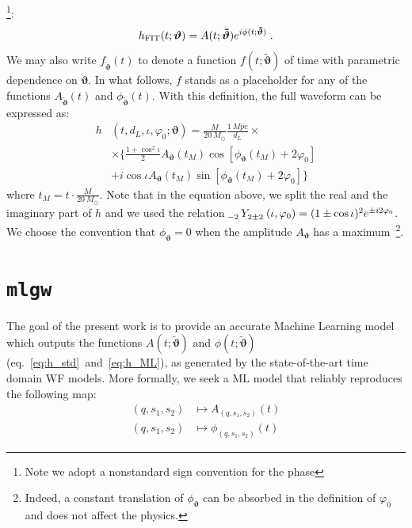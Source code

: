 \footnote{Note we adopt a nonstandard sign convention for the phase}:
\begin{equation} \label{eq:h_ML}
	h_{\rm FIT}(t; \boldsymbol{\vartheta}) = A(t; \boldsymbol{\tilde{\vartheta}}) e^{i \phi(t; \boldsymbol{\tilde{\vartheta}})} \; . 
\end{equation}
We may also write $f_{\boldsymbol{\tilde{\vartheta}}}(t)$ to denote a 
function $f(t;\boldsymbol{\tilde{\vartheta}})$ of time with parametric dependence on $\boldsymbol{\vartheta}$.
In what follows, $f$ stands as a placeholder for any of the functions $A_{\tilde{\boldsymbol{\vartheta}}}(t)$ 
and ${\phi}_{\tilde{\boldsymbol{\vartheta}}}(t)$.
With this definition, the full waveform can be expressed as:
\begin{align} 
	h&(t, d_L,\iota,\varphi_0; \boldsymbol{\vartheta}) = \frac{M}{\SI{20}{M_\odot}} \frac{\SI{1}{Mpc}}{d_L} \times  \nonumber \\
		&\times \Bigg\{ \frac{1+\cos^2\iota}{2} A_{\boldsymbol{\vartheta}}(t_M)  \cos[\phi_{\boldsymbol{\vartheta}}(t_M)+2\varphi_0]  \nonumber \\
		&+ i \cos\iota A_{\boldsymbol{\vartheta}}(t_M)
 \sin[\phi_{\boldsymbol{\vartheta}}(t_M)+2\varphi_0] \Bigg\}
\label{eq:h_parametrization_simple}
\end{align}
where $t_M = t \cdot \frac{M}{\SI{20}{M_\odot}}$.
Note that in the equation above, we split the real and the imaginary part of $h$ and we 
used the relation ${\tensor[_{-2}]{Y}{_{2 \pm 2}}(\iota, \varphi_0) = (1 \pm \cos \iota)^2 e^{\pm i 2 \varphi_0}}$.
We choose the convention that $\phi_{\boldsymbol{\vartheta}} = 0$ when the amplitude $A_{\boldsymbol{\vartheta}}$ 
has a maximum~\footnote{Indeed, a constant translation of $\phi_{\boldsymbol{\vartheta}}$ can be absorbed in the definition of $\varphi_0$ and does not affect the physics.}.

\section{\lowercase{\texttt{mlgw}}}
\label{sec:model}
%
The goal of the present work is to provide an accurate Machine Learning model which outputs the functions $A(t;\boldsymbol{\tilde{\vartheta}})$ and $\phi(t;\boldsymbol{\tilde{\vartheta}})$ (eq.~\eqref{eq:h_std}~and~\eqref{eq:h_ML}), as generated by the state-of-the-art time domain WF models.
More formally, we seek a ML model that reliably reproduces the following map:
\begin{align}
	(q, s_1, s_2) &\longmapsto A_{(q, s_1, s_2)}(t) \label{eq:objective_amp}\\
	(q, s_1, s_2) &\longmapsto \phi_{(q, s_1, s_2)}(t) \label{eq:objective_ph}
\end{align}

